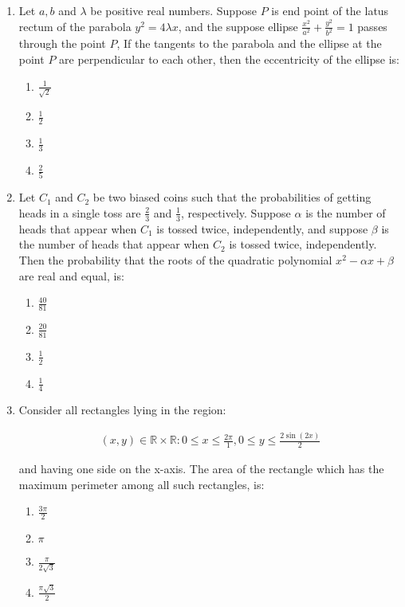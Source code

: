 \documentclass{article}
\begin{document}
\begin{enumerate}
\item   Let $a, b$ and $\lambda$ be positive real numbers. Suppose $P$ is end point of the latus rectum of the parabola $y^2 = 4\lambda x$, and the suppose ellipse $\frac{x^2}{a^2} + \frac{y^2}{b^2} = 1$ passes through the point $P$, If the tangents to the parabola and the ellipse at the point $P$ are perpendicular to each other, then the eccentricity of the ellipse is:

    \begin{enumerate}
        \item  $\frac{1}{\sqrt{2}}$
        \item  $\frac{1}{2}$
        \item  $\frac{1}{3}$
        \item  $\frac{2}{5}$
    \end{enumerate}

\item    Let $C_1$ and $C_2$ be two biased coins such that the probabilities of getting heads in a single toss are $\frac{2}{3}$ and $\frac{1}{3}$, respectively. Suppose $\alpha$ is the number of heads that appear when $C_1$ is tossed twice, independently, and suppose $\beta$ is the number of heads that appear when $C_2$ is tossed twice, independently. Then the probability that the roots of the quadratic polynomial $x^2 - \alpha x +\beta$ are real and equal, is:

    \begin{enumerate}
        \item  $\frac{40}{81}$
        \item  $\frac{20}{81}$
        \item  $\frac{1}{2}$
        \item  $\frac{1}{4}$
    \end{enumerate}

\item   Consider all rectangles lying in the region:

\begin{align}
	 {(x,y) \in \mathbb{R} \times \mathbb{R} : 0 \leq x \leq \frac{2\pi} 1, 0 \leq y \leq \frac{2\sin(2x)}{2}}
\end{align}

    and having one side on the x-axis. The area of the rectangle which has the maximum perimeter among all such rectangles, is:

    \begin{enumerate}
        \item  $\frac{3\pi}{2}$
        \item  $\pi$
        \item  $\frac{\pi}{2\sqrt{3}}$
        \item  $\frac{\pi\sqrt{3}}{2}$
    \end{enumerate}


\end{enumerate}
\end{document}
